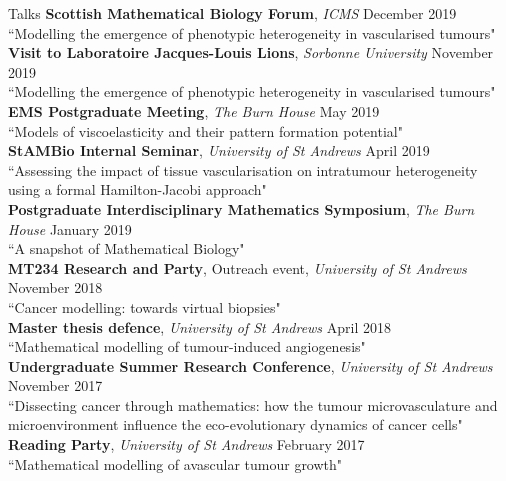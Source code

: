 \documentclass{resume} %
\begin{document}
\begin{rSection}{Talks}
{\bf Scottish Mathematical Biology Forum}, {\em ICMS} \hfill {December 2019} \\
{``Modelling the emergence of phenotypic heterogeneity in vascularised tumours"}  \\
{\bf Visit to Laboratoire Jacques-Louis Lions}, {\em Sorbonne University} \hfill {November 2019} \\
{``Modelling the emergence of phenotypic heterogeneity in vascularised tumours"}  \\
{\bf EMS Postgraduate Meeting}, {\em The Burn House} \hfill {May 2019} \\
{``Models of viscoelasticity and their pattern formation potential"}  \\
{\bf StAMBio Internal Seminar}, {\em University of St Andrews} \hfill {April 2019} \\
{``Assessing the impact of tissue vascularisation on intratumour heterogeneity using a formal Hamilton-Jacobi approach"} \\
{\bf Postgraduate Interdisciplinary Mathematics Symposium}, {\em The Burn House} \hfill {January 2019} \\
{``A snapshot of Mathematical Biology"} \\
{\bf MT234 Research and Party}, Outreach event, {\em University of St Andrews} \hfill {November 2018} \\
{``Cancer modelling: towards virtual biopsies"} \\
{\bf Master thesis defence},  {\em University of St Andrews} \hfill {April 2018} \\
{``Mathematical modelling of tumour-induced angiogenesis"} \\
{\bf Undergraduate Summer Research Conference}, {\em University of St Andrews} \hfill {November 2017} \\
{``Dissecting cancer through mathematics: how the tumour microvasculature and microenvironment influence the eco-evolutionary dynamics of cancer cells"} 
\\
{\bf Reading Party}, {\em University of St Andrews} \hfill {February 2017} \\
{``Mathematical modelling of avascular tumour growth"} 
\end{rSection}
\end{document}

